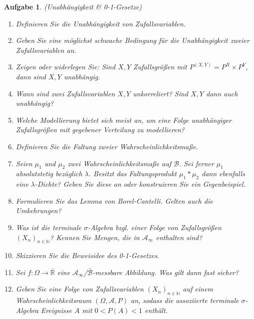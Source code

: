 \documentclass[11pt, a4paper, ngerman]{article}
\newcommand{\N}{\mathbb{N}}
\newcommand{\R}{\mathbb{R}}
\newtheorem{aufgabe}{Aufgabe}
\begin{document}
\begin{aufgabe} (Unabhängigkeit \& 0-1-Gesetze)
   \begin{enumerate}
        \item 
        Definieren Sie die Unabhängigkeit von Zufallsvariablen.
        \item 
        Geben Sie eine möglichst schwache Bedingung für die Unabhängigkeit zweier Zufallsvariablen an. 
        \item 
        Zeigen oder widerlegen Sie: Sind $X,Y$ Zufallsgrößen mit  $P^{(X,Y)} = P^X \times P^Y$, dann sind $X,Y$ unabhängig. 
        \item 
        Wann sind zwei Zufallsvariablen $X,Y$ unkorreliert? Sind $X,Y$ dann auch unabhängig? 
        \item 
        Welche Modellierung bietet sich meist an, um eine Folge unabhängiger Zufallsgrößen mit gegebener Verteilung zu modellieren? 
        \item 
        Definieren Sie die Faltung zweier Wahrscheinlichkeitsmaße. 
        \item 
        Seien $\mu_1$ und $\mu_2$ zwei Wahrscheinlichkeitsmaße auf $\mathcal{B}$. Sei ferner $\mu_1$ absolutstetig bezüglich $\lambda$. Besitzt das Faltungsprodukt $\mu_1 * \mu_2$ dann ebenfalls eine $\lambda$-Dichte? Geben Sie diese an oder konstruieren Sie ein Gegenbeispiel. 
        \item   
        Formulieren Sie das Lemma von Borel-Cantelli. Gelten auch die Umkehrungen? 
        \item
        Was ist die terminale $\sigma$-Algebra bzgl. einer Folge von Zufallsgrößen $(X_n)_{n \in \N}$? Kennen Sie Mengen, die in $\mathcal{A}_{\infty}$ enthalten sind? 
        \item 
        Skizzieren Sie die Beweisidee des 0-1-Gesetzes. 
        \item 
        Sei $f: \Omega \to \bar{\R}$ eine $\mathcal{A}_{\infty}$/$\bar{\mathcal{B}}$-messbare Abbildung. Was gilt dann fast sicher? 
        \item 
        Geben Sie eine Folge von Zufallsvariablen $(X_n)_{n \in \N}$ auf einem Wahrscheinlichkeitsraum $(\Omega, \mathcal{A}, P)$ an, sodass die assoziierte terminale $\sigma$-Algebra Ereignisse $A$ mit $0 < P(A) < 1$ enthält. 
    \end{enumerate}
    
\end{aufgabe}
\end{document}
